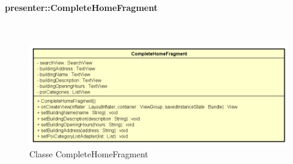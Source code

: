\documentclass[../DefinizioneDiProdotto.tex]{subfiles}
\begin{document}
\paragraph{presenter::CompleteHomeFragment}
\
\begin{figure}[H]
	\centering
	\includegraphics[width=\maxwidth]{img/CompleteHomeFragment.png}
	\caption{Classe CompleteHomeFragment}\label{fig:presenter::CompleteHomeFragment} 
\end{figure}
\end{document}
